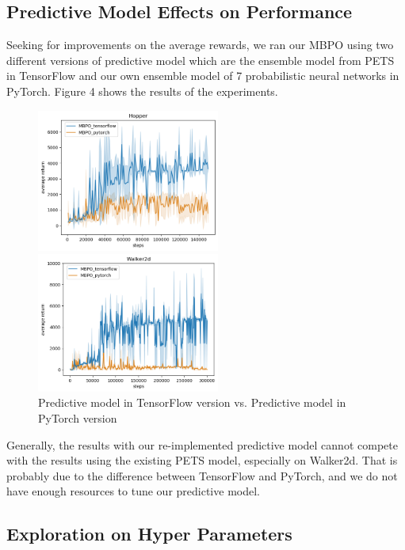\subsection{Predictive Model Effects on Performance}

Seeking for improvements on the average rewards, we ran our MBPO using two different versions of predictive model which are the ensemble model from PETS in TensorFlow and our own ensemble model of 7 probabilistic neural networks in PyTorch. Figure 4 shows the results of the experiments.

\begin{figure}[h]
\centering
\begin{minipage}[t]{0.48\textwidth}
\centering
\includegraphics[width=6cm]{../openreview/tfVSpyHopper.png}
\end{minipage}
\begin{minipage}[t]{0.48\textwidth}
\centering
\includegraphics[width=6cm]{../openreview/tfVSpyWalker2d.png}
\end{minipage}
\caption{Predictive model in TensorFlow version vs. Predictive model in PyTorch version}
\end{figure}

Generally, the results with our re-implemented predictive model cannot compete with the results using the existing PETS model, especially on Walker2d. That is probably due to the difference between TensorFlow and PyTorch, and we do not have enough resources to tune our predictive model.

\subsection{Exploration on Hyper Parameters}

